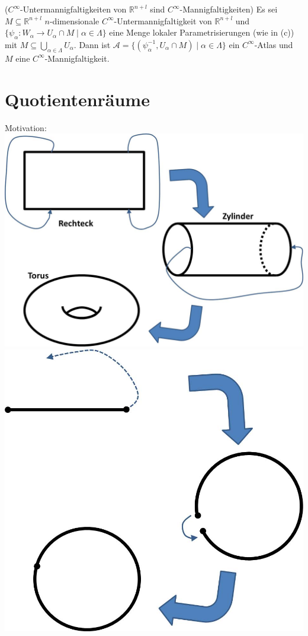 \documentclass[a4paper,11pt,notitlepage]{report}
\theoremstyle{definition}
\newcommand{\R}{{\ensuremath{\mathbb{R}}}}
\begin{document}
\begin{theorem}{($C^\infty$-Untermannigfaltigkeiten von $\R^{n+l}$ sind $C^\infty$-Mannigfaltigkeiten)}
	Es sei $M \subseteq \R^{n+l}$ $n$-dimensionale $C^\infty$-Untermannigfaltigkeit von $\R^{n+l}$ und $\{\psi_\alpha \colon W_\alpha \rightarrow U_\alpha \cap M \mid \alpha \in \Lambda\}$ eine Menge lokaler Parametrisierungen (wie in (c)) mit $M \subseteq \bigcup\limits_{\alpha \in \Lambda}{U_\alpha}$.
	Dann ist $\mathcal{A} = \{(\psi_\alpha^{-1}, U_\alpha \cap M) \mid \alpha \in \Lambda\}$ ein $C^\infty$-Atlas und $M$ eine $C^\infty$-Mannigfaltigkeit.
\end{theorem}

\newpage
\section{Quotientenräume}
Motivation:\newline
\includegraphics[scale=0.6]{images/Identifizierung1.jpg}\newline
\includegraphics[scale=0.6]{images/Identifizierung2.jpg}\newline
\end{document}
